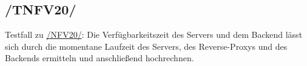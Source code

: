 \subsection*{/TNFV20/}

\label{/TNFV20/} Testfall zu \hyperref[/NFV20/]{/NFV20/}: Die Verfügbarkeitszeit des \Gls{Server}s und dem \Gls{Backend} lässt sich durch die momentane Laufzeit des \Gls{Server}s,
des \Gls{Reverse-Proxy}s und des \Gls{Backend}s ermitteln und anschließend hochrechnen.
